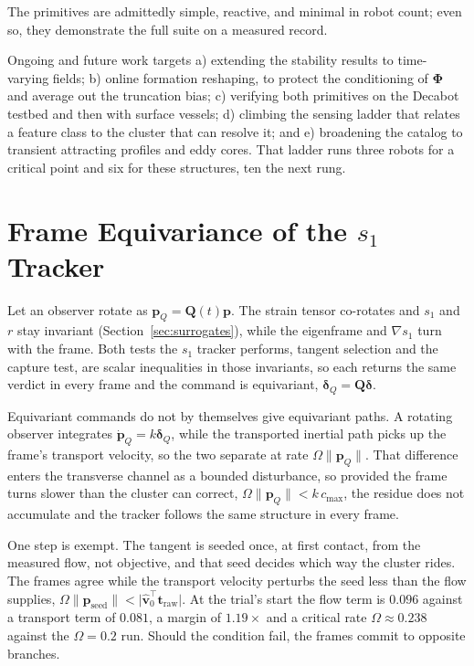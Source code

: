 \documentclass[lettersize,journal]{IEEEtran}
\begin{document}
The primitives are admittedly simple, reactive, and minimal in robot
count; even so, they demonstrate the full suite on a measured record.

Ongoing and future work targets a) extending the stability results to
time-varying fields; b) online formation reshaping, to protect the
conditioning of $\boldsymbol{\Phi}$ and average out the truncation
bias; c) verifying both primitives on the Decabot testbed and then with
surface vessels; d) climbing the sensing ladder that relates a feature
class to the cluster that can resolve it; and e) broadening the catalog
to transient attracting profiles and eddy cores. That ladder runs three
robots for a critical point \cite{8} and six for these structures, ten
the next rung.

\appendices

\section{Frame Equivariance of the $s_1$ Tracker}
\label{app:equivariance}

Let an observer rotate as $\mathbf{p}_Q = \mathbf{Q}(t)\mathbf{p}$. The
strain tensor co-rotates and $s_1$ and $r$ stay invariant
(Section~\ref{sec:surrogates}), while the eigenframe and $\nabla s_1$
turn with the frame. Both tests the $s_1$ tracker performs, tangent
selection and the capture test, are scalar inequalities in those
invariants, so each returns the same verdict in every frame and the
command is equivariant, $\boldsymbol{\delta}_Q = \mathbf{Q}\boldsymbol{\delta}$.

Equivariant commands do not by themselves give equivariant paths. A
rotating observer integrates $\dot{\mathbf{p}}_Q = k\boldsymbol{\delta}_Q$,
while the transported inertial path picks up the frame's transport
velocity, so the two separate at rate $\Omega\lVert\mathbf{p}_Q\rVert$.
That difference enters the transverse channel as a bounded disturbance,
so provided the frame turns slower than the cluster can correct,
$\Omega\lVert\mathbf{p}_Q\rVert < k\,c_{\max}$, the residue does not
accumulate and the tracker follows the same structure in every frame.

One step is exempt. The tangent is seeded once, at first contact, from
the measured flow, not objective, and that seed decides which
way the cluster rides. The frames agree while the transport
velocity perturbs the seed less than the flow supplies,
$\Omega\lVert\mathbf{p}_{\text{seed}}\rVert <
\lvert\hat{\mathbf{v}}_0^\top\mathbf{t}_{\text{raw}}\rvert$.
At the trial's start the flow term is $0.096$ against a transport term
of $0.081$, a margin of $1.19\times$ and a critical rate
$\Omega \approx 0.238$ against the $\Omega = 0.2$ run. Should the
condition fail, the frames commit to opposite branches.
\end{document}
